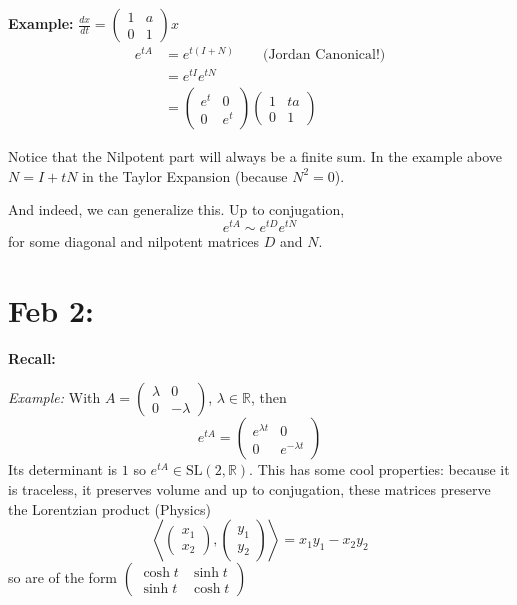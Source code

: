 \documentclass[12pt]{article}
\newcommand{\R}{\mathbb{R}}
\newcommand{\brak}[1]{\left\langle #1 \right\rangle}
\newcommand{\SL}{\text{SL}}
\begin{document}
    \textbf{Example:} $\frac{dx}{dt} = \begin{pmatrix}
        1 & a\\ 
        0 & 1
    \end{pmatrix}x$
    \begin{align*}
        e^{tA} &= e^{t(I + N)} \qquad \text{(Jordan Canonical!)}\\ 
            &= e^{tI}e^{tN}\\ 
            &= \begin{pmatrix}
                e^t & 0\\ 
                0 & e^t
            \end{pmatrix} \begin{pmatrix}
                1 & ta\\ 
                0 & 1
            \end{pmatrix}
    \end{align*}

    Notice that the Nilpotent part will always be a finite sum. In the example above $N = I + tN$ in the Taylor Expansion (because $N^2 = 0$).

    And indeed, we can generalize this. Up to conjugation, 
    \[e^{tA} \sim e^{tD} e^{tN}\]
    for some diagonal and nilpotent matrices $D$ and $N$.

\section{Feb 2:}
    \textbf{Recall:} 
    
    \emph{Example:} With $A = \begin{pmatrix}
        \lambda & 0\\ 
        0 & -\lambda
    \end{pmatrix}$, $\lambda \in \R$, then 
    \[e^{tA} = \begin{pmatrix}
        e^{\lambda t} & 0\\ 
        0 & e^{-\lambda t}
    \end{pmatrix}\]
    Its determinant is $1$ so $e^{tA} \in \SL(2, \R)$. This has some cool properties: because it is traceless, it preserves volume and up to conjugation, these matrices preserve the Lorentzian product (Physics) 
    \[\brak{\begin{pmatrix}
        x_1\\x_2
    \end{pmatrix}, \begin{pmatrix}
        y_1\\y_2
    \end{pmatrix}} = x_1 y_1 - x_2 y_2\] 
    so are of the form $\begin{pmatrix}
        \cosh t & \sinh t\\
        \sinh t & \cosh t
    \end{pmatrix}$
\end{document}
